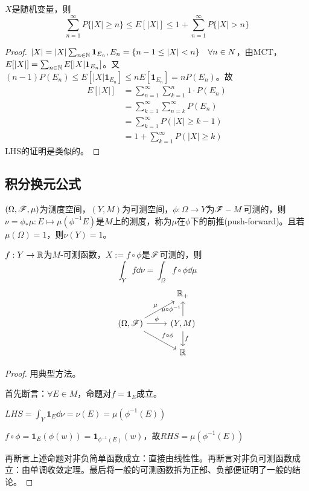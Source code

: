 \documentclass{ctexart}
\begin{document}
\begin{Prop}[Layered公式]
  $X$是随机变量，则\[\sum_{n=1}^{\infty}P\{|X|\geq n\}\leq E[|X|]\leq 1+\sum_{n=1}^{\infty}P\{|X|>n\}\]
\end{Prop}
\begin{proof}
  $|X|=|X|\sum_{n\in\mathbb{N}}\bm 1_{E_{n}},E_{n}=\{n-1\leq|X|< n\}\quad\forall n\in N$，由MCT，$E[|X|]=\sum_{n\in\mathbb{N}}E[|X|\bm 1_{E_{n}}]$。又$(n-1)P(E_{n})\leq E[|X|\bm 1_{E_{n}}]\leq nE[\bm 1_{E_{n}}]=nP(E_{n})$。故
\begin{align*}
  E[|X|]&=\sum_{n=1}^{\infty}\sum_{k=1}^{n}1\cdot P(E_{n})\\
        &=\sum_{k=1}^{\infty}\sum_{n=k}^{\infty}P(E_{n})\\
        &=\sum_{k=1}^{\infty}P(|X|\geq k-1)\\
        &=1+\sum_{k=1}^{\infty}P(|X|\geq k)
\end{align*}
    LHS的证明是类似的。
\end{proof}

\subsection{积分换元公式}
\begin{Thm}
  $(\Omega,\mathscr{F},\mu)$为测度空间，$(Y,M)$为可测空间，$\phi: \Omega\to Y$为$\mathscr{F}-M$可测的，则$\nu=\phi_{*}\mu: E\mapsto \mu(\phi^{-1}E)$是$M$上的测度，称为$\mu$在$\phi$下的前推(push-forward)。且若$\mu(\Omega)=1$，则$\nu(Y)=1$。

  $f:Y\to\mathbb{R}$为$M$-可测函数，$X:=f\circ \phi$是$\mathscr{F}$可测的，则
  \[\int_{Y}f\dd\nu=\int_{\Omega}f\circ\phi\dd\mu\]
  \[
\begin{tikzcd}                                                                                   & \mathbb{R}_+                                           \\
{(\Omega,\mathscr{F})} \arrow[ru, "\mu", shift right] \arrow[r, "\phi"] \arrow[rd, "f\circ \phi"] & {(Y,M)} \arrow[u, "\mu\circ \phi^{-1}"] \arrow[d, "f"] \\
                                                                                                  & \mathbb{R}                                            
\end{tikzcd}  \]
  
\end{Thm}

\begin{proof}
  用典型方法。

  首先断言：$\forall E\in M$，命题对$f=\bm 1_{E}$成立。

  $LHS=\int_{Y}\bm 1_{E}\dd\nu=\nu(E)=\mu(\phi^{-1}(E))$

  $f\circ \phi=\bm 1_{E}(\phi(w))=\bm 1_{\phi^{-1}(E)}(w)$，故$RHS=\mu(\phi^{-1}(E))$

  再断言上述命题对非负简单函数成立：直接由线性性。再断言对非负可测函数成立：由单调收敛定理。最后将一般的可测函数拆为正部、负部便证明了一般的结论。
\end{proof}
\end{document}

